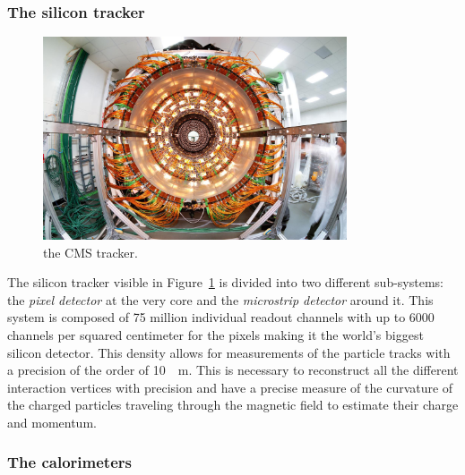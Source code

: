 		\subsubsection{The silicon tracker}
		\label{chapt2:sssec:tracker}
	
	\begin{figure}[H]
		\centering
		\includegraphics[height = 6cm]{fig/chapt2/Tracker.jpg}
		\caption{\label{fig:tracker} the CMS tracker.}
	\end{figure}
	
	The silicon tracker visible in Figure~\ref{fig:tracker} is divided into two different sub-systems: the \textit{pixel detector} at the very core and the \textit{microstrip detector} around it. This system is composed of 75 million individual readout channels with up to 6000 channels per squared centimeter for the pixels making it the world's biggest silicon detector. This density allows for measurements of the particle tracks with a precision of the order of \SI{10}{\mu m}. This is necessary to reconstruct all the different interaction vertices with precision and have a precise measure of the curvature of the charged particles traveling through the magnetic field to estimate their charge and momentum.
	
		\subsubsection{The calorimeters}
		\label{chapt2:sssec:calo}
	
